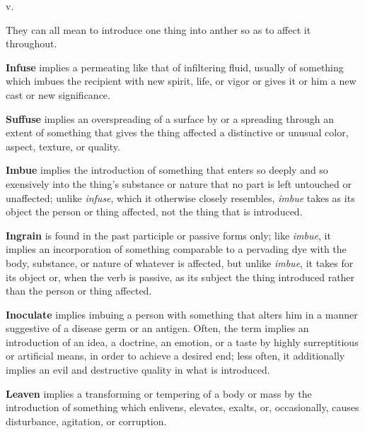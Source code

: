 \begin{description}[style=unboxed]
 v.
\begin{mynewitemize}
\item They can all mean to introduce one thing into anther so as to affect
it throughout.
\item \textbf{Infuse} implies a permeating like that of infiltering fluid,
usually of something which imbues the recipient with new spirit, life, or
vigor or gives it or him a new cast or new significance.
\item \textbf{Suffuse} implies an overspreading of a surface by or a 
spreading through an extent of something that gives the thing affected
a distinctive or unusual color, aspect, texture, or quality.
\item \textbf{Imbue} implies the introduction of something that enters
so deeply and so exensively into the thing's substance or nature that
no part is left untouched or unaffected; unlike \textit{infuse}, which it
otherwise closely resembles, \textit{imbue} takes as its object the person
or thing affected, not the thing that is introduced.
\item \textbf{Ingrain} is found in the past participle or passive forms 
only; like \textit{imbue}, it implies an incorporation of something
comparable to a pervading dye with the body, substance, or nature of
whatever is affected, but unlike \textit{imbue}, it takes for its object
or, when the verb is passive, as its subject the thing introduced rather
than the person or thing affected.
\item \textbf{Inoculate} implies imbuing a person with something that 
alters him in a manner suggestive of a disease germ or an antigen. Often,
the term implies an introduction of an idea, a doctrine, an emotion, or
a taste by highly surreptitious or artificial means, in order to achieve 
a desired end; less often, it additionally implies an evil and destructive
quality in what is introduced.
\item \textbf{Leaven} implies a transforming or tempering of a body or
mass by the introduction of something which enlivens, elevates, exalts, 
or, occasionally, causes disturbance, agitation, or corruption.
\end{mynewitemize}


\end{description}
